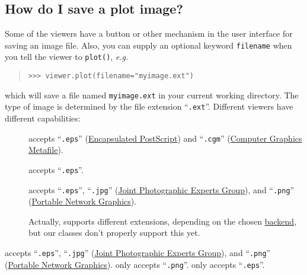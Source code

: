     \subsection{How do I save a plot image?} Some of the viewers have a
    button or other mechanism in the user interface for saving an
    image file. Also, you can supply an optional keyword
    \verb+filename+ when you tell the viewer to \verb+plot()+,
    \emph{e.g.}
    \begin{quote}
\begin{verbatim}
>>> viewer.plot(filename="myimage.ext")
\end{verbatim}
    \end{quote}
    which will save a file named \verb+myimage.ext+ in your current
    working directory. The type of image is determined by the file
    extension ``\verb+.ext+''. Different viewers have different
    capabilities: 
    
        \begin{description}
            \item[\Pygist{}] accepts ``\verb+.eps+''
            (\href{http://en.wikipedia.org/wiki/Encapsulated_PostScript}{Encapsulated
            PostScript}) and ``\verb+.cgm+''
            (\href{http://xml.coverpages.org/cgm.html}{Computer
            Graphics Metafile}).
        
            \item[\gnuplot{}] accepts ``\verb+.eps+''.
        
            \item[\Matplotlib{}] accepts ``\verb+.eps+'',
            ``\verb+.jpg+'' (\href{http://www.jpeg.org/}{Joint
            Photographic Experts Group}), and ``\verb+.png+''
            (\href{http://www.w3.org/Graphics/PNG/}{Portable Network
            Graphics}).
            
            \begin{reSTadmonition}[Attention]
                Actually, \Matplotlib{} supports different 
                extensions, depending on the chosen 
                \href{http://matplotlib.sourceforge.net/backends.html}{backend}, but our 
                 classes don't properly 
                support this yet.
            \end{reSTadmonition}
            
        \end{description}
        
    \Pygist{}  \Matplotlib{} accepts ``\verb+.eps+'', ``\verb+.jpg+''
    (\href{http://www.jpeg.org/}{Joint Photographic Experts Group}),
    and ``\verb+.png+''
    (\href{http://www.w3.org/Graphics/PNG/}{Portable Network
    Graphics}). \MayaVi{} only accepts ``\verb+.png+''. \gnuplot{} 
    only accepts ``\verb+.eps+''.
    
